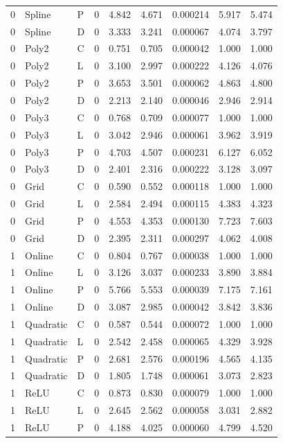 \begin{longtable}{lllrrrrrr}
0 & Spline & P & 0 & 4.842 & 4.671 & 0.000214 & 5.917 & 5.474 \\
0 & Spline & D & 0 & 3.333 & 3.241 & 0.000067 & 4.074 & 3.797 \\
0 & Poly2 & C & 0 & 0.751 & 0.705 & 0.000042 & 1.000 & 1.000 \\
0 & Poly2 & L & 0 & 3.100 & 2.997 & 0.000222 & 4.126 & 4.076 \\
0 & Poly2 & P & 0 & 3.653 & 3.501 & 0.000062 & 4.863 & 4.800 \\
0 & Poly2 & D & 0 & 2.213 & 2.140 & 0.000046 & 2.946 & 2.914 \\
0 & Poly3 & C & 0 & 0.768 & 0.709 & 0.000077 & 1.000 & 1.000 \\
0 & Poly3 & L & 0 & 3.042 & 2.946 & 0.000061 & 3.962 & 3.919 \\
0 & Poly3 & P & 0 & 4.703 & 4.507 & 0.000231 & 6.127 & 6.052 \\
0 & Poly3 & D & 0 & 2.401 & 2.316 & 0.000222 & 3.128 & 3.097 \\
0 & Grid & C & 0 & 0.590 & 0.552 & 0.000118 & 1.000 & 1.000 \\
0 & Grid & L & 0 & 2.584 & 2.494 & 0.000115 & 4.383 & 4.323 \\
0 & Grid & P & 0 & 4.553 & 4.353 & 0.000130 & 7.723 & 7.603 \\
0 & Grid & D & 0 & 2.395 & 2.311 & 0.000297 & 4.062 & 4.008 \\
1 & Online & C & 0 & 0.804 & 0.767 & 0.000038 & 1.000 & 1.000 \\
1 & Online & L & 0 & 3.126 & 3.037 & 0.000233 & 3.890 & 3.884 \\
1 & Online & P & 0 & 5.766 & 5.553 & 0.000039 & 7.175 & 7.161 \\
1 & Online & D & 0 & 3.087 & 2.985 & 0.000042 & 3.842 & 3.836 \\
1 & Quadratic & C & 0 & 0.587 & 0.544 & 0.000072 & 1.000 & 1.000 \\
1 & Quadratic & L & 0 & 2.542 & 2.458 & 0.000065 & 4.329 & 3.928 \\
1 & Quadratic & P & 0 & 2.681 & 2.576 & 0.000196 & 4.565 & 4.135 \\
1 & Quadratic & D & 0 & 1.805 & 1.748 & 0.000061 & 3.073 & 2.823 \\
1 & ReLU & C & 0 & 0.873 & 0.830 & 0.000079 & 1.000 & 1.000 \\
1 & ReLU & L & 0 & 2.645 & 2.562 & 0.000058 & 3.031 & 2.882 \\
1 & ReLU & P & 0 & 4.188 & 4.025 & 0.000060 & 4.799 & 4.520 \\

\end{longtable}

